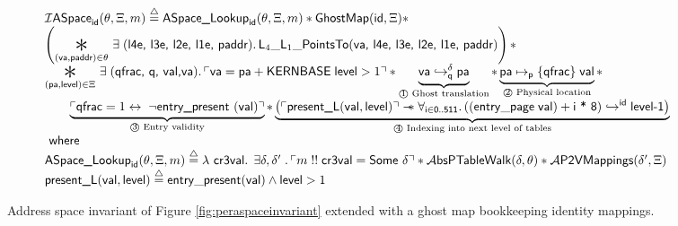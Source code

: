 \begin{figure*}
\footnotesize
\[
\begin{array}{l}
  \mathcal{I}\textsf{ASpace}_{\textsf{id}}(\ptablestore,\Xi,m)\stackrel{\triangle}{=} \textsf{ASpace\_Lookup}_{\textsf{id}}(\ptablestore,\Xi,m) \ast \mathsf{GhostMap}(\mathsf{id},\Xi)\ast\\
  \left(\bigast{(\vaddr, \textsf{paddr})\in \ptablestore}{\exists\;(\textsf{l4e, l3e, l2e, l1e, paddr})\ldotp \textsf{L}_{4}\_\textsf{L}_{1}\_\textsf{PointsTo}(\vaddr\textsf{, l4e, l3e, l2e, l1e, paddr})}\right)\ast \\
  \bigast{(\paddr,\mathsf{level}) \in \Xi}{\exists\; (\textsf{qfrac, q, val,}\vaddr) \ldotp \ulcorner \vaddr = \paddr + \textsf{KERNBASE} \; \textsf{level} > 1\urcorner \ast  \underbrace{\fracghostmaptoken{\delta}{\vaddr}{\paddr}{\qfrac} }_\text{\textcircled{1} Ghost translation} \ast \underbrace{\paddr \mapsto_{\mathsf{p}}\{\textsf{qfrac}\}\; \vale}_\text{\textcircled{2} Physical location}} \ast\\
   \qquad\underbrace{ \ulcorner \textsf{qfrac} = 1 \leftrightarrow \; \lnot\textsf{entry\_present }(\vale) \urcorner}_\text{\textcircled{3} Entry validity}\ast 
    \underbrace{\left(\ulcorner\textsf{present\_L}(\vale,\mathsf{level})\urcorner \wand \forall_{\textsf{i}\in\textsf{0..511}} \ldotp \ghostmaptoken{\textsf{id}}{((\mathsf{entry\_page}\;\vale) + \textsf{i * 8})}{\textsf{level-1}}\right)}_{\text{\textcircled{4} Indexing into next level of tables}} \\
  \textsf{ where } \\
   \textsf{ASpace\_Lookup}_{\textsf{id}}(\ptablestore,\Xi,m) \stackrel{\triangle}{=} \lambda\textsf{ cr3val} \ldotp \; \exists \gammaPred,\gammaPred' \; \ldotp \ulcorner m \; !!\; \textsf{cr3val} = \textsf{Some } \gammaPred \urcorner \ast
   \ptableabswalk{\delta,\ptablestore} \ast \pvmapping{\delta',\Xi}\\
  \textsf{present\_L}(\vale,\mathsf{level})\stackrel{\triangle}{=} \mathsf{entry\_present}(\vale)\land \mathsf{level} > 1
  
\end{array}
\]
\vspace{-1em}
\caption{Address space invariant of Figure \ref{fig:peraspaceinvariant} extended with a ghost map bookkeeping identity mappings. }
  \label{fig:peraspaceinvariant_with_p2v_extensionC}
\vspace{-1em}
\end{figure*}

